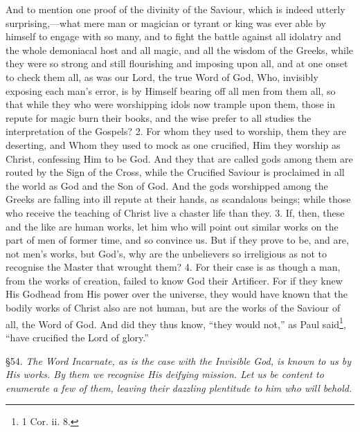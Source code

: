 And to mention one proof of the divinity of the Saviour, which is indeed utterly surprising,—what mere man or magician or tyrant or king was ever able by himself to engage with so many, and to fight the battle against all idolatry and the whole demoniacal host and all magic, and all the wisdom of the Greeks, while they were so strong and still flourishing and imposing upon all, and at one onset to check them all, as was our Lord, the true Word of God, Who, invisibly exposing each man’s error, is by Himself bearing off all men from them all, so that while they who were worshipping idols now trample upon them, those in repute for magic burn their books, and the wise prefer to all studies the interpretation of the Gospels? 2. For whom they used to worship, them they are deserting, and Whom they used to mock as one crucified, Him they worship as Christ, confessing Him to be God. And they that are called gods among them are routed by the Sign of the Cross, while the Crucified Saviour is proclaimed in all the world as God and the Son of God. And the gods worshipped among the Greeks are falling into ill repute at their hands, as scandalous beings; while those who receive the teaching of Christ live a chaster life than they. 3. If, then, these and the like are human works, let him who will point out similar works on the part of men of former time, and so convince us. But if they prove to be, and are, not men’s works, but God’s, why are the unbelievers so irreligious as not to recognise the Master that wrought them? 4. For their case is as though a man, from the works of creation, failed to know God their Artificer. For if they knew His Godhead from His power over the universe, they would have known that the bodily works of Christ also are not human, but are the works of the Saviour of all, the Word of God. And did they thus know, “they would not,” as Paul said\footnote{1 Cor. ii. 8.}, “have crucified the Lord of glory.”


§54. \emph{The Word Incarnate, as is the case with the Invisible God, is known to us by His works. By them we recognise His deifying mission. Let us be content to enumerate a few of them, leaving their dazzling plentitude to him who will behold.}

